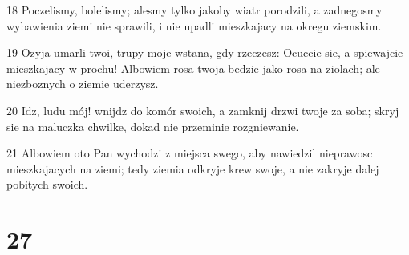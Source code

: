 \par 18 Poczelismy, bolelismy; alesmy tylko jakoby wiatr porodzili, a zadnegosmy wybawienia ziemi nie sprawili, i nie upadli mieszkajacy na okregu ziemskim.
\par 19 Ozyja umarli twoi, trupy moje wstana, gdy rzeczesz: Ocuccie sie, a spiewajcie mieszkajacy w prochu! Albowiem rosa twoja bedzie jako rosa na ziolach; ale niezboznych o ziemie uderzysz.
\par 20 Idz, ludu mój! wnijdz do komór swoich, a zamknij drzwi twoje za soba; skryj sie na maluczka chwilke, dokad nie przeminie rozgniewanie.
\par 21 Albowiem oto Pan wychodzi z miejsca swego, aby nawiedzil nieprawosc mieszkajacych na ziemi; tedy ziemia odkryje krew swoje, a nie zakryje dalej pobitych swoich.

\chapter{27}

